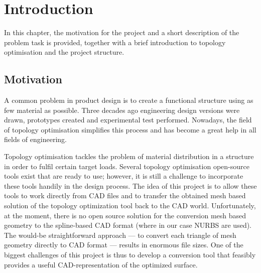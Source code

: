 \chapter{Introduction}
\label{chapter:Introduction}
In this chapter, the motivation for the project and a short description of the problem task is provided, together with a brief introduction to topology optimisation and the project structure.
\section{Motivation}
A common problem in product design is to create a functional structure using as few material as possible. Three decades ago engineering design versions were drawn, prototypes created and experimental test performed. Nowadays, the field of topology optimisation simplifies this process and has become a great help in all fields of engineering. 

Topology optimisation tackles the problem of material distribution in a structure in order to fulfil certain target loads. Several topology optimisation open-source tools exist that are ready to use; however, it is still a challenge to incorporate these tools handily in the design process. The idea of this project is to allow these tools to work directly from \acf{CAD} files and to transfer the obtained mesh based solution of the topology optimization tool back to the \ac{CAD} world. Unfortunately, at the moment, there is no open source solution for the conversion mesh based geometry to the spline-based \ac{CAD} format (where in our case \ac{NURBS} are used). The would-be straightforward approach --- to convert each triangle of mesh geometry directly to \ac{CAD} format --- results in enormous file sizes. One of the biggest challenges of this project is thus to develop a conversion tool that feasibly provides a useful \ac{CAD}-representation of the optimized surface.


%
%

